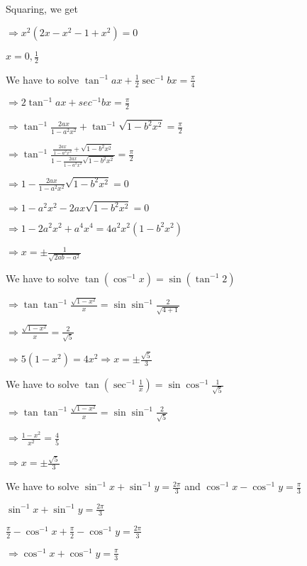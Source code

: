   Squaring, we get

  $\Rightarrow x^2\left(2x - x^2 -1 + x^2\right) = 0$

  $x = 0, \frac{1}{2}$

\item We have to solve $\tan^{-1}ax + \frac{1}{2}\sec^{-1}bx = \frac{\pi}{4}$

  $\Rightarrow 2\tan^{-1}ax + sec^{-1}bx = \frac{\pi}{2}$

  $\Rightarrow \tan^{-1}\frac{2ax}{1 - a^2x^2} + \tan^{-1}\sqrt{1 - b^2x^2} = \frac{\pi}{2}$

  $\Rightarrow \tan^{-1}\frac{\frac{2ax}{1 - a^2x^2} + \sqrt{1 - b^2x^2}}{1 - \frac{2ax}{1 - a^2x^2}\sqrt{1 - b^2x^2}} =
  \frac{\pi}{2}$

  $\Rightarrow 1 - \frac{2ax}{1 - a^2x^2}\sqrt{1 - b^2x^2} = 0$

  $\Rightarrow 1 - a^2x^2 - 2ax\sqrt{1 - b^2x^2} = 0$

  $\Rightarrow 1 - 2a^2x^2 + a^4x^4 = 4a^2x^2(1 - b^2x^2)$

  $\Rightarrow x = \pm \frac{1}{\sqrt{2ab - a^2}}$

\item We have to solve $\tan(\cos^{-1}x) = \sin(\tan^{-1}2)$

  $\Rightarrow \tan\tan^{-1}\frac{\sqrt{1 - x^2}}{x} = \sin\sin^{-1}\frac{2}{\sqrt{4 + 1}}$

  $\Rightarrow \frac{\sqrt{1 - x^2}}{x} = \frac{2}{\sqrt{5}}$

  $\Rightarrow 5(1 - x^2) = 4x^2 \Rightarrow x = \pm\frac{\sqrt{5}}{3}$

\item We have to solve $\tan\left(\sec^{-1}\frac{1}{x}\right) = \sin\cos^{-1}\frac{1}{\sqrt{5}}$

  $\Rightarrow \tan\tan^{-1}\frac{\sqrt{1 - x^2}}{x} = \sin\sin^{-1}\frac{2}{\sqrt{5}}$

  $\Rightarrow \frac{1 - x^2}{x^2} = \frac{4}{5}$

  $\Rightarrow x = \pm\frac{\sqrt{5}}{3}$

\item We have to solve $\sin^{-1}x + \sin^{-1}y = \frac{2\pi}{3}$ and $\cos^{-1}x - \cos^{-1}y = \frac{\pi}{3}$

  $\sin^{-1}x + \sin^{-1}y = \frac{2\pi}{3}$

  $\frac{\pi}{2} - \cos^{-1}x + \frac{\pi}{2} - \cos^{-1} y = \frac{2\pi}{3}$

  $\Rightarrow \cos^{-1}x + \cos^{-1}y = \frac{\pi}{3}$

